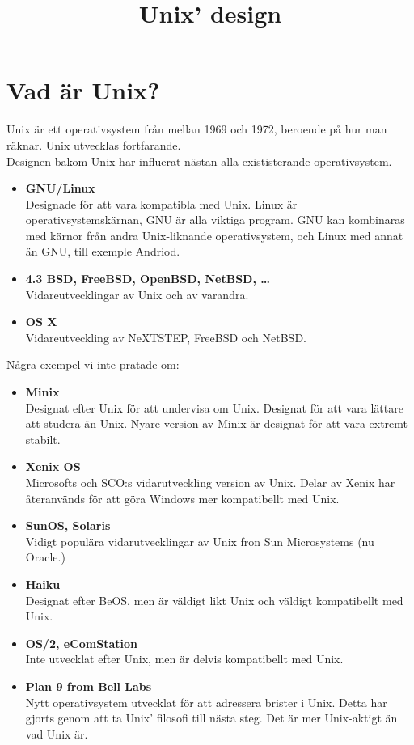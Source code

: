 \documentclass[12pt,a4paper]{article}
\begin{document}
\title{\Huge{\textbf{Unix' design}}}
\date{}
\author{}
\maketitle


\section*{Vad är Unix?}

Unix är ett operativsystem från mellan 1969 och 1972,
beroende på hur man räknar. Unix utvecklas fortfarande.
\\

\noindent
Designen bakom Unix har influerat nästan alla
exististerande operativsystem.
\begin{itemize}
\item \textbf{GNU/Linux}\\
Designade för att vara kompatibla med Unix.
Linux är operativsystemskärnan, GNU är alla viktiga program.
GNU kan kombinaras med kärnor från andra Unix-liknande operativsystem,
och Linux med annat än GNU, till exemple Andriod.
\item \textbf{4.3 BSD, FreeBSD, OpenBSD, NetBSD, \ldots}\\
Vidareutvecklingar av Unix och av varandra.
\item \textbf{OS X}\\
Vidareutveckling av NeXTSTEP, FreeBSD och NetBSD.
\end{itemize}
Några exempel vi inte pratade om:
\begin{itemize}
\item \textbf{Minix}\\
Designat efter Unix för att undervisa om Unix. Designat
för att vara lättare att studera än Unix. Nyare version
av Minix är designat för att vara extremt stabilt.
\item \textbf{Xenix OS}\\
Microsofts och SCO:s vidarutveckling version av Unix.
Delar av Xenix har återanvänds för att göra Windows
mer kompatibellt med Unix.
\item \textbf{SunOS, Solaris}\\
Vidigt populära vidarutvecklingar av Unix fron Sun Microsystems (nu Oracle.)
\item \textbf{Haiku}\\
Designat efter BeOS, men är väldigt likt Unix och väldigt kompatibellt med Unix.
\item \textbf{OS/2, eComStation}\\
Inte utvecklat efter Unix, men är delvis kompatibellt med Unix.
\item \textbf{Plan 9 from Bell Labs}\\
Nytt operativsystem utvecklat för att adressera brister i Unix.
Detta har gjorts genom att ta Unix' filosofi till nästa steg.
Det är mer Unix-aktigt än vad Unix är.
\end{itemize}
\end{document}
